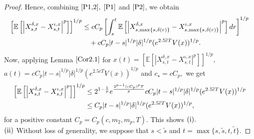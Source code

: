 \documentclass[11pt]{article}
\theoremstyle{theorem}
\theoremstyle{definition}
\newcommand{\bR}{\mathbb{R}}
\newcommand{\1}{{\bf 1}}
\begin{document}
\begin{proof}
Hence, combining $\eqref{P1,2},$ $\eqref{P1}$ and $\eqref{P2}$, we obtain
\begin{align*}
\left[\mathbb{E}\left[\left|X^{\delta, x}_{s,t}-X^{\iota, x}_{s,t}\right|^p\right]\right]^{1/p} 
& \le c C_p \left[ \int_s^t \mathbb{E} \left[ \left| X_{s,\max\{s,\delta(r)\}}^{\delta,x} -X_{s,\max\{s,\delta(r)\}}^{\iota,x} \right|^p\right] dr \right]^{1/p}\notag \\
& \quad  + c C_p |t-s|^{1/p} |\delta|^{1/p} (e^{2.5\overline{c}T}V(x))^{1/p}.
\end{align*}
Now, applying Lemma $\ref{Cor2.1}$ for $x(t)= \left[\mathbb{E}\left[\left|X^{\delta, x}_{s,t}-X^{\iota, x}_{s,t}\right|^p\right]\right]^{1/p},$ $ a(t)= c C_p |t-s|^{1/p} |\delta|^{1/p} (e^{2.5\overline{c}T}V(x))^{1/p} $ and $c_{\star} = c C_p,$ we get 
\begin{align*}
\left[\mathbb{E}\left[\left|X^{\delta, x}_{s,t}-X^{\iota, x}_{s,t}\right|^p\right]\right]^{1/p} & \leq 2^{1-\frac{1}{p}}  e^{\frac{2^{p-1} (c C_p )^p T}{p}} c C_p |t-s|^{1/p} |\delta|^{1/p} (e^{2.5\overline{c}T}V(x))^{1/p} \notag \\
  & \leq  C_p |t-s|^{1/p} |\delta|^{1/p} (e^{2.5\overline{c}T}V(x))^{1/p},
 \end{align*}
for a positive constant $C_p=C_p(c, m_2, m_p, T).$ 
This shows $\textup{(i)}.$\\
 $\textup{(ii)}$ Without loss of generality, we suppose that $s< \widetilde{s}$ and $t = \max\{s, \tilde{s}, t, \tilde{t}\}$.


\end{proof}
\end{document}
